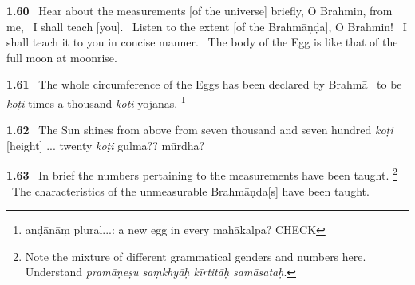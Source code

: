 \documentclass{article}
\newcommand{\skt}[1]{\textit{#1}}
\begin{document}
\textbf{1.60}%
\ Hear about the measurements [of the universe] briefly, O Brahmin, from me,%
\              I shall teach [you].%
\ Listen to the extent [of the Brahmāṇḍa], O Brahmin!%
\                 I shall teach it to you in concise manner.%
\         The body of the Egg is like that of the full moon at moonrise.%


\textbf{1.61}%
\ The whole circumference of the Eggs has been declared by Brahmā%
\              to be \skt{koṭi} times a thousand \skt{koṭi} yojanas.%
\footnote{aṇḍānāṃ plural...: a new egg in every mahākalpa? CHECK }%


\textbf{1.62}%
\ The Sun shines from above from seven thousand and seven hundred \skt{koṭi} [height] ... twenty \skt{koṭi} gulma?? mūrdha?%


\textbf{1.63}%
\ In brief the numbers pertaining to the measurements have been taught.%
\footnote{Note the mixture of different grammatical genders and numbers here.                 Understand \skt{pramāṇeṣu saṃkhyāḥ kīrtitāḥ samāsataḥ}. }%
\ The characteristics of the unmeasurable Brahmāṇḍa[s] have been taught.%
\end{document}
